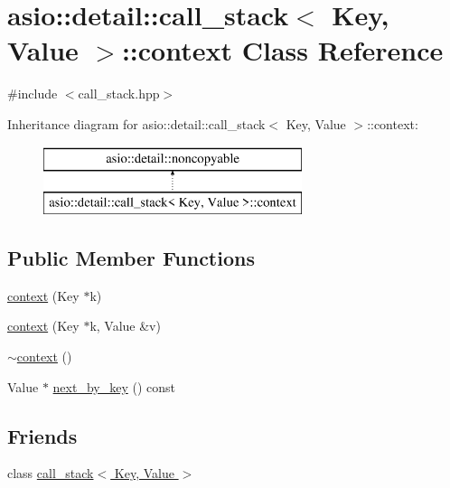 \hypertarget{classasio_1_1detail_1_1call__stack_1_1context}{}\section{asio\+:\+:detail\+:\+:call\+\_\+stack$<$ Key, Value $>$\+:\+:context Class Reference}
\label{classasio_1_1detail_1_1call__stack_1_1context}


{\ttfamily \#include $<$call\+\_\+stack.\+hpp$>$}

Inheritance diagram for asio\+:\+:detail\+:\+:call\+\_\+stack$<$ Key, Value $>$\+:\+:context\+:\begin{figure}[H]
\begin{center}
\leavevmode
\includegraphics[height=2.000000cm]{classasio_1_1detail_1_1call__stack_1_1context}
\end{center}
\end{figure}
\subsection*{Public Member Functions}
\begin{DoxyCompactItemize}
\item 
\hyperlink{classasio_1_1detail_1_1call__stack_1_1context_a99fb9e977507edbdf3d6ee2cb591b7cf}{context} (Key $\ast$k)
\item 
\hyperlink{classasio_1_1detail_1_1call__stack_1_1context_a72c972cc177b7f4ae7d4517aeb1ff33a}{context} (Key $\ast$k, Value \&v)
\item 
\hyperlink{classasio_1_1detail_1_1call__stack_1_1context_a24ef09956e9cf6c5c1cc494a5d25bc0b}{$\sim$context} ()
\item 
Value $\ast$ \hyperlink{classasio_1_1detail_1_1call__stack_1_1context_a02becdb9c673713de9bfb5eeb9ea9109}{next\+\_\+by\+\_\+key} () const 
\end{DoxyCompactItemize}
\subsection*{Friends}
\begin{DoxyCompactItemize}
\item 
class \hyperlink{classasio_1_1detail_1_1call__stack_1_1context_a3bc7e70c9cc3b79c5256516316cc3ea9}{call\+\_\+stack$<$ Key, Value $>$}
\end{DoxyCompactItemize}


